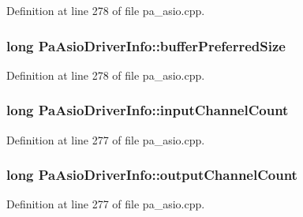 Definition at line 278 of file pa\+\_\+asio.\+cpp.

\subsubsection[{\texorpdfstring{buffer\+Preferred\+Size}{bufferPreferredSize}}]{\setlength{\rightskip}{0pt plus 5cm}long Pa\+Asio\+Driver\+Info\+::buffer\+Preferred\+Size}\hypertarget{struct_pa_asio_driver_info_aabf41e27226680dc49d3cdb2e908b236}{}\label{struct_pa_asio_driver_info_aabf41e27226680dc49d3cdb2e908b236}


Definition at line 278 of file pa\+\_\+asio.\+cpp.

\subsubsection[{\texorpdfstring{input\+Channel\+Count}{inputChannelCount}}]{\setlength{\rightskip}{0pt plus 5cm}long Pa\+Asio\+Driver\+Info\+::input\+Channel\+Count}\hypertarget{struct_pa_asio_driver_info_a0a647be77ba5229d7fc0e308a4d6f052}{}\label{struct_pa_asio_driver_info_a0a647be77ba5229d7fc0e308a4d6f052}


Definition at line 277 of file pa\+\_\+asio.\+cpp.

\subsubsection[{\texorpdfstring{output\+Channel\+Count}{outputChannelCount}}]{\setlength{\rightskip}{0pt plus 5cm}long Pa\+Asio\+Driver\+Info\+::output\+Channel\+Count}\hypertarget{struct_pa_asio_driver_info_afa1f7776a464da1766ac5c23198e01fb}{}\label{struct_pa_asio_driver_info_afa1f7776a464da1766ac5c23198e01fb}


Definition at line 277 of file pa\+\_\+asio.\+cpp.

